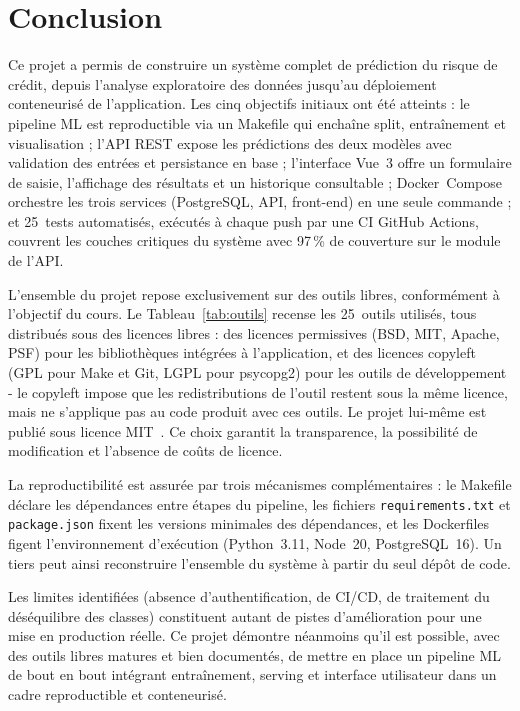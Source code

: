 \documentclass[12pt,a4paper,openany]{report}
\begin{document}
\chapter{Conclusion}

Ce projet a permis de construire un système complet de prédiction du risque de crédit, depuis l'analyse exploratoire des données jusqu'au déploiement conteneurisé de l'application. Les cinq objectifs initiaux ont été atteints : le pipeline ML est reproductible via un Makefile qui enchaîne split, entraînement et visualisation ; l'API REST expose les prédictions des deux modèles avec validation des entrées et persistance en base ; l'interface Vue~3 offre un formulaire de saisie, l'affichage des résultats et un historique consultable ; Docker~Compose orchestre les trois services (PostgreSQL, API, front-end) en une seule commande ; et 25~tests automatisés, exécutés à chaque push par une CI GitHub Actions, couvrent les couches critiques du système avec 97\,\% de couverture sur le module de l'API.

L'ensemble du projet repose exclusivement sur des outils libres, conformément à l'objectif du cours. Le Tableau~\ref{tab:outils} recense les 25~outils utilisés, tous distribués sous des licences libres : des licences permissives (BSD, MIT, Apache, PSF) pour les bibliothèques intégrées à l'application, et des licences copyleft (GPL pour Make et Git, LGPL pour psycopg2) pour les outils de développement - le copyleft impose que les redistributions de l'outil restent sous la même licence, mais ne s'applique pas au code produit avec ces outils. Le projet lui-même est publié sous licence MIT~\cite{mit-license}. Ce choix garantit la transparence, la possibilité de modification et l'absence de coûts de licence.

La reproductibilité est assurée par trois mécanismes complémentaires : le Makefile déclare les dépendances entre étapes du pipeline, les fichiers \texttt{requirements.txt} et \texttt{package.json} fixent les versions minimales des dépendances, et les Dockerfiles figent l'environnement d'exécution (Python~3.11, Node~20, PostgreSQL~16). Un tiers peut ainsi reconstruire l'ensemble du système à partir du seul dépôt de code.

Les limites identifiées (absence d'authentification, de CI/CD, de traitement du déséquilibre des classes) constituent autant de pistes d'amélioration pour une mise en production réelle. Ce projet démontre néanmoins qu'il est possible, avec des outils libres matures et bien documentés, de mettre en place un pipeline ML de bout en bout intégrant entraînement, serving et interface utilisateur dans un cadre reproductible et conteneurisé.
\end{document}
